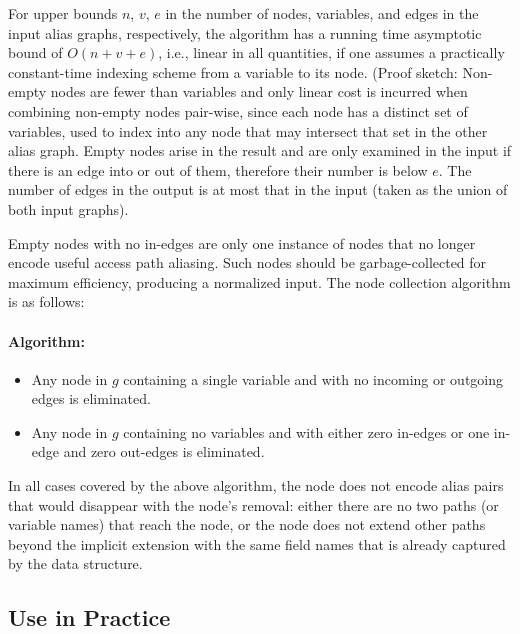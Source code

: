 For upper bounds $n$, $v$, $e$ in the number of nodes, variables, and
edges in the input alias graphs, respectively, the algorithm has a
running time asymptotic bound of $O(n + v + e)$, i.e., linear in all
quantities, if one assumes a
practically constant-time indexing scheme from a variable to its
node. (Proof sketch: Non-empty nodes are fewer than variables and only
linear cost is incurred when combining non-empty nodes pair-wise,
since each node has a distinct set of variables, used to index into
any node that may intersect that set in the other alias graph. Empty
nodes arise in the result and are only examined in the input if
there is an edge into or out of them, therefore their number is below $e$.
The number of edges in the output is at most that in the input (taken
as the union of both input graphs).

Empty nodes with no in-edges are only one instance of nodes that no
longer encode useful access path aliasing. Such nodes should be
garbage-collected for maximum efficiency, producing a normalized
input. The node collection algorithm is as follows:

\paragraph{Algorithm: }
\begin{itemize}
\item Any node in $g$ containing a single variable and with no incoming or outgoing
  edges is eliminated.
\item Any node in $g$ containing no variables and with either zero in-edges
  or one in-edge and zero out-edges is eliminated.
\end{itemize}

In all cases covered by the above algorithm, the node does not encode
alias pairs that would disappear with the node's removal: either there
are no two paths (or variable names) that reach the node, or the node
does not extend other paths beyond the implicit extension with the same
field names that is already captured by the data structure.

\subsection{Use in Practice}

